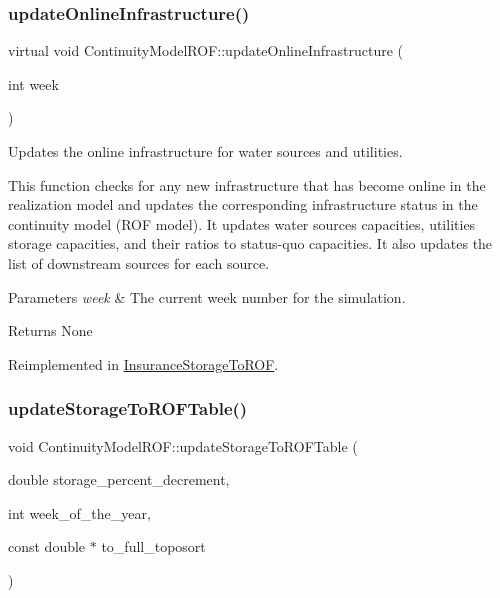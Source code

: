 \subsubsection{\texorpdfstring{update\+Online\+Infrastructure()}{updateOnlineInfrastructure()}}
{\footnotesize\ttfamily virtual void Continuity\+Model\+R\+O\+F\+::update\+Online\+Infrastructure (\begin{DoxyParamCaption}\item[{int}]{week }\end{DoxyParamCaption})\hspace{0.3cm}{\ttfamily [virtual]}}



Updates the online infrastructure for water sources and utilities. 

This function checks for any new infrastructure that has become online in the realization model and updates the corresponding infrastructure status in the continuity model (R\+OF model). It updates water sources\textquotesingle{} capacities, utilities\textquotesingle{} storage capacities, and their ratios to status-\/quo capacities. It also updates the list of downstream sources for each source.


\begin{DoxyParams}{Parameters}
{\em week} & The current week number for the simulation.\\
\hline
\end{DoxyParams}
\begin{DoxyReturn}{Returns}
None 
\end{DoxyReturn}


Reimplemented in \mbox{\hyperlink{classInsuranceStorageToROF_a5870934b8b33e1d872eca7b0940398ac}{Insurance\+Storage\+To\+R\+OF}}.

\mbox{\label{classContinuityModelROF_a28834584763c3aa27a6f0917aa68926f}} 
\subsubsection{\texorpdfstring{update\+Storage\+To\+R\+O\+F\+Table()}{updateStorageToROFTable()}}
{\footnotesize\ttfamily void Continuity\+Model\+R\+O\+F\+::update\+Storage\+To\+R\+O\+F\+Table (\begin{DoxyParamCaption}\item[{double}]{storage\+\_\+percent\+\_\+decrement,  }\item[{int}]{week\+\_\+of\+\_\+the\+\_\+year,  }\item[{const double $\ast$}]{to\+\_\+full\+\_\+toposort }\end{DoxyParamCaption})}



